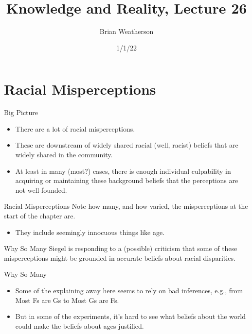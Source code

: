 \documentclass[
  17pt,
  letterpaper,
  ignorenonframetext,
  aspectratio=169,
  xcolor={dvipsnames}]{beamer}
\title{Knowledge and Reality, Lecture 26}
\author{Brian Weatherson}
\date{1/1/22}
\providecommand{\tightlist}{%
  \setlength{\itemsep}{0pt}\setlength{\parskip}{0pt}}\usepackage{longtable,booktabs,array}
\begin{document}
\frame{\titlepage}
\ifdefined\Shaded\renewenvironment{Shaded}{\begin{tcolorbox}[interior hidden, boxrule=0pt, frame hidden, breakable, borderline west={3pt}{0pt}{shadecolor}, enhanced, sharp corners]}{\end{tcolorbox}}\fi

\hypertarget{racial-misperceptions}{%
\section{Racial Misperceptions}\label{racial-misperceptions}}

\begin{frame}{Big Picture}
\protect\hypertarget{big-picture}{}
\begin{itemize}[<+->]
\tightlist
\item
  There are a lot of racial misperceptions.
\item
  These are downstream of widely shared racial (well, racist) beliefs
  that are widely shared in the community.
\item
  At least in many (most?) cases, there is enough individual culpability
  in acquiring or maintaining these background beliefs that the
  perceptions are not well-founded.
\end{itemize}
\end{frame}

\begin{frame}{Racial Misperceptions}
\protect\hypertarget{racial-misperceptions-1}{}
Note how many, and how varied, the misperceptions at the start of the
chapter are.

\begin{itemize}[<+->]
\tightlist
\item
  They include seemingly innocuous things like age.
\end{itemize}
\end{frame}

\begin{frame}{Why So Many}
\protect\hypertarget{why-so-many}{}
Siegel is responding to a (possible) criticism that some of these
misperceptions might be grounded in accurate beliefs about racial
disparities.
\end{frame}

\begin{frame}{Why So Many}
\protect\hypertarget{why-so-many-1}{}
\begin{itemize}[<+->]
\tightlist
\item
  Some of the explaining away here seems to rely on bad inferences,
  e.g., from Most Fs are Gs to Most Gs are Fs.
\item
  But in some of the experiments, it's hard to see what beliefs about
  the world could make the beliefs about ages justified.
\end{itemize}
\end{frame}
\end{document}
